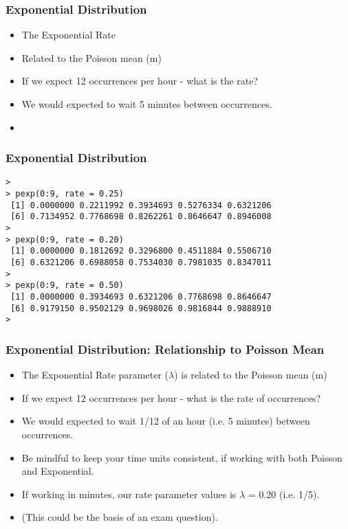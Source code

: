 \documentclass[a4]{beamer}
\begin{document}
\begin{frame}[fragile]
\frametitle{Exponential Distribution}
\begin{itemize}
\item The Exponential Rate 
\item Related to the Poisson mean (m)
\item If we expect 12 occurrences per hour - what is the rate?
\item We would expected to wait 5 minutes between occurrences.
\item 
\end{itemize}
\end{frame}
\begin{frame}[fragile]
\frametitle{Exponential Distribution}
\begin{verbatim}
>
> pexp(0:9, rate = 0.25)
 [1] 0.0000000 0.2211992 0.3934693 0.5276334 0.6321206
 [6] 0.7134952 0.7768698 0.8262261 0.8646647 0.8946008
>
> pexp(0:9, rate = 0.20)
 [1] 0.0000000 0.1812692 0.3296800 0.4511884 0.5506710
 [6] 0.6321206 0.6988058 0.7534030 0.7981035 0.8347011
>
> pexp(0:9, rate = 0.50)
 [1] 0.0000000 0.3934693 0.6321206 0.7768698 0.8646647
 [6] 0.9179150 0.9502129 0.9698026 0.9816844 0.9888910
> 
\end{verbatim}
\end{frame}


\begin{frame}[fragile]
	\frametitle{Exponential Distribution: Relationship to Poisson Mean}
	\begin{itemize}
		\item The Exponential Rate parameter ($\lambda$) is related to the Poisson mean (m)
		\item If we expect 12 occurrences per hour - what is the rate of occurrences?
		\item We would expected to wait 1/12 of an hour (i.e. 5 minutes) between occurrences.
		\item Be mindful to keep your time units consistent, if working with both Poisson and Exponential.
		\item If working in minutes, our rate parameter values is $\lambda$ = 0.20 (i.e. 1/5).
		\item (This could be the basis of an exam question).
	\end{itemize}
\end{frame}
\end{document}
